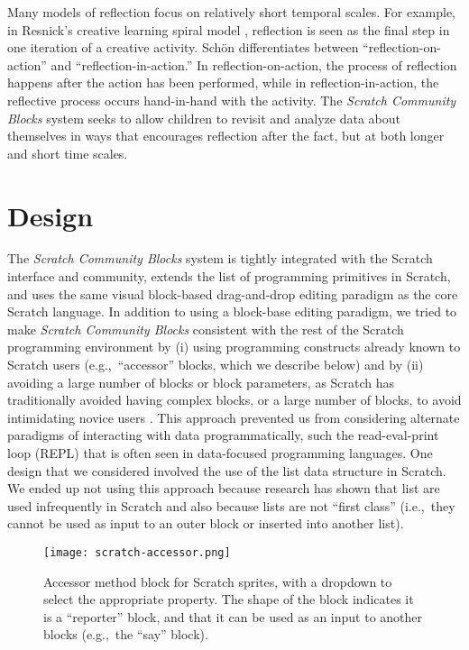 \documentclass{sigchi}
\begin{document}
Many models of reflection focus on relatively short temporal scales. For example, in Resnick's creative learning spiral model \cite{resnick_sowing_2008}, reflection is seen as the final step in one iteration of a creative activity. Schön \cite{schon_reflective_1983} differentiates between ``reflection-on-action'' and ``reflection-in-action.'' In reflection-on-action, the process of reflection happens after the action has been performed, while in reflection-in-action, the reflective process occurs hand-in-hand with the activity. The \emph{Scratch Community Blocks} system seeks to allow children to revisit and analyze data about themselves in ways that encourages reflection after the fact, but at both longer and short time scales.

\section{Design}

The \emph{Scratch Community Blocks} system is tightly integrated with the Scratch interface and community, extends the list of programming primitives in Scratch, and uses the same visual block-based drag-and-drop editing paradigm as the core Scratch language. In addition to using a block-base editing paradigm, we tried to make \emph{Scratch Community Blocks} consistent with the rest of the Scratch programming environment by (i) using programming constructs already known to Scratch users (e.g.,~``accessor'' blocks, which we describe below) and by (ii) avoiding a large number of blocks or block parameters, as Scratch has traditionally avoided having complex blocks, or a large number of blocks, to avoid intimidating novice users \cite{dasgupta_extending_2015}. This approach prevented us from considering alternate paradigms of interacting with data programmatically, such the read-eval-print loop (REPL) that is often seen in data-focused programming languages. One design that we considered involved the use of the list data structure in Scratch. We ended up not using this approach because research has shown that list are used infrequently in Scratch \cite{aivaloglou_how_2016} and also because lists are not ``first class'' (i.e.,~they cannot be used as input to an outer block or inserted into another list).

\begin{figure}[h!]
\texttt{[image: scratch-accessor.png]}
\centering
\caption{Accessor method block for Scratch sprites, with a dropdown to select the appropriate property. The shape of the block indicates it is a ``reporter'' block, and that it can be used as an input to another blocks (e.g.,~the ``say'' block).}
\label{fig:accessor}
\end{figure}
\end{document}
